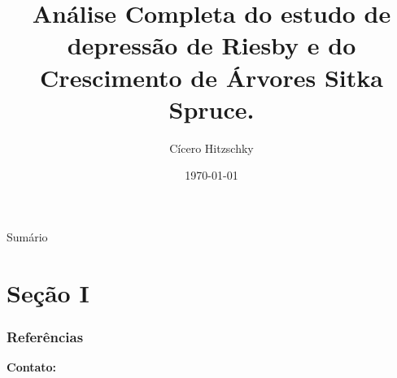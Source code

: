 \documentclass{libs/ufc_format}
\title[Aprendizado Estatístico em Dados Longitudinais]{\huge\textbf{Análise Completa do estudo de depressão de Riesby e do Crescimento de Árvores Sitka Spruce.}}
\subtitle{}
\author{Cícero Hitzschky}
\institute[UFC]{
    \normalsize{\email{cicero.hitzschky@alu.ufc.br}}
    \newline
    \department{Departamento de Estatística e Matemática Aplicada}
    \newline
    \ufc
}
\date{\today}
\begin{document}


\begin{frame}{}
    \maketitle
\end{frame}

\begin{frame}{Sumário}
    \begin{multicols}{2}
        \tableofcontents
    \end{multicols}
\end{frame}

\section{Seção I}






%    

\begin{frame}[allowframebreaks]
    \frametitle{Referências}
    \printbibliography
\end{frame}

\begin{frame}{}
    \centering
    \huge{\textbf{}}
    
    \vspace{1cm}
    
    \Large{\textbf{Contato:}}
    \newline
    \vspace*{0.5cm}
    \large{}
\end{frame}
\end{document}
